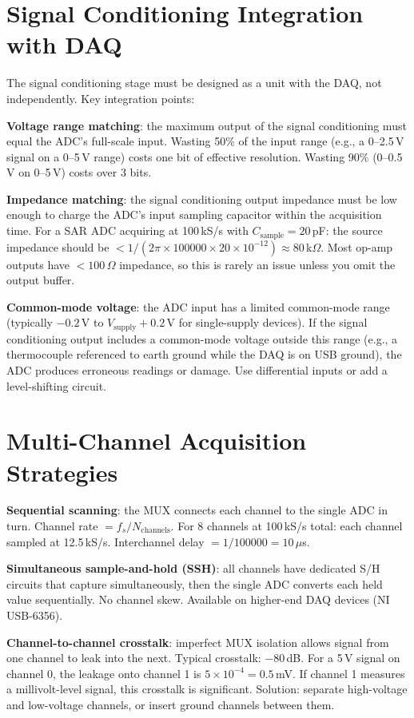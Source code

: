\documentclass[11pt,letterpaper,twoside,openany]{book}
\begin{document}
\section{Signal Conditioning Integration with DAQ}
The signal conditioning stage must be designed as a unit with the DAQ, not independently. Key integration points:

\textbf{Voltage range matching}: the maximum output of the signal conditioning must equal the ADC's full-scale input. Wasting 50\% of the input range (e.g., a 0--2.5\,V signal on a 0--5\,V range) costs one bit of effective resolution. Wasting 90\% (0--0.5\,V on 0--5\,V) costs over 3 bits.

\textbf{Impedance matching}: the signal conditioning output impedance must be low enough to charge the ADC's input sampling capacitor within the acquisition time. For a SAR ADC acquiring at 100\,kS/s with $C_{\text{sample}} = 20$\,pF: the source impedance should be $< 1/(2\pi \times 100000 \times 20 \times 10^{-12}) \approx 80$\,k$\Omega$. Most op-amp outputs have $< 100\,\Omega$ impedance, so this is rarely an issue unless you omit the output buffer.

\textbf{Common-mode voltage}: the ADC input has a limited common-mode range (typically $-0.2$\,V to $V_{\text{supply}} + 0.2$\,V for single-supply devices). If the signal conditioning output includes a common-mode voltage outside this range (e.g., a thermocouple referenced to earth ground while the DAQ is on USB ground), the ADC produces erroneous readings or damage. Use differential inputs or add a level-shifting circuit.

\section{Multi-Channel Acquisition Strategies}
\textbf{Sequential scanning}: the MUX connects each channel to the single ADC in turn. Channel rate $= f_s / N_{\text{channels}}$. For 8 channels at 100\,kS/s total: each channel sampled at 12.5\,kS/s. Interchannel delay $= 1/100000 = 10\,\mu$s.

\textbf{Simultaneous sample-and-hold (SSH)}: all channels have dedicated S/H circuits that capture simultaneously, then the single ADC converts each held value sequentially. No channel skew. Available on higher-end DAQ devices (NI USB-6356).

\textbf{Channel-to-channel crosstalk}: imperfect MUX isolation allows signal from one channel to leak into the next. Typical crosstalk: $-80$\,dB. For a 5\,V signal on channel 0, the leakage onto channel 1 is $5 \times 10^{-4} = 0.5$\,mV. If channel 1 measures a millivolt-level signal, this crosstalk is significant. Solution: separate high-voltage and low-voltage channels, or insert ground channels between them.
\end{document}
